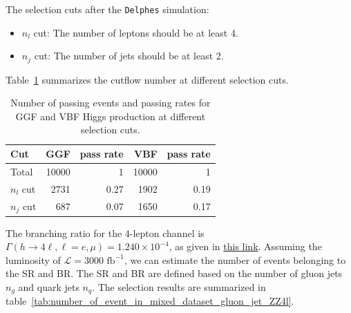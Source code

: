 \documentclass[12pt]{article}
\begin{document}
        The selection cuts after the \verb|Delphes| simulation:
        \begin{itemize}
            \item $n_{l}$ cut: The number of leptons should be at least 4.
            \item $n_{j}$ cut: The number of jets should be at least 2.
        \end{itemize}

        Table~\ref{tab:GGF_VBF_Higgs_cutflow_number_ZZ4l} summarizes the cutflow number at different selection cuts.
        \begin{table}[htpb]
            \centering
            \caption{Number of passing events and passing rates for GGF and VBF Higgs production at different selection cuts.}
            \label{tab:GGF_VBF_Higgs_cutflow_number_ZZ4l}
            \begin{tabular}{l|rr|rr}
                Cut         & GGF   & pass rate & VBF   & pass rate \\ \hline
                Total       & 10000 & 1         & 10000 & 1         \\
                $n_{l}$ cut & 2731  & 0.27      & 1902  & 0.19      \\
                $n_j$ cut   & 687   & 0.07      & 1650  & 0.17
            \end{tabular}
        \end{table}

        The branching ratio for the 4-lepton channel is $\Gamma\left( h \to 4\ell, \ell = e, \mu \right) = 1.240 \times 10^{-4}$, as given in \href{https://twiki.cern.ch/twiki/bin/view/LHCPhysics/CERNYellowReportPageBR}{this link}. Assuming the luminosity of $\mathcal{L} = \text{3000 fb}^{-1}$, we can estimate the number of events belonging to the SR and BR. The SR and BR are defined based on the number of gluon jets $n_g$ and quark jets $n_q$. The selection results are summarized in table~\ref{tab:number_of_event_in_mixed_dataset_gluon_jet_ZZ4l}.
\end{document}
